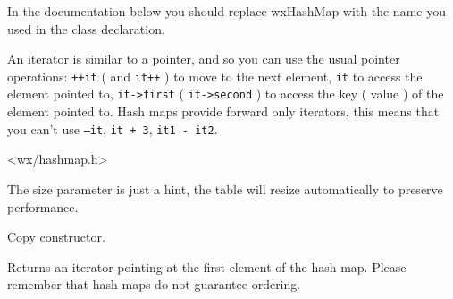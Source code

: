 
In the documentation below you should replace wxHashMap with the name
you used in the class declaration.

\begin{twocollist}
\end{twocollist}


An iterator is similar to a pointer, and so you can use the usual pointer
operations: {\tt ++it} ( and {\tt it++} ) to move to the next element,
{\tt *it} to access the element pointed to, {\tt it->first}
( {\tt it->second} ) to access the key ( value )
of the element pointed to. Hash maps provide forward only iterators, this
means that you can't use {\tt --it}, {\tt it + 3}, {\tt it1 - it2}.


<wx/hashmap.h>


\label{wxhashmapctor}


The size parameter is just a hint, the table will resize automatically
to preserve performance.


Copy constructor.

\label{wxhashmapbegin}



Returns an iterator pointing at the first element of the hash map.
Please remember that hash maps do not guarantee ordering.

\label{wxhashmapclear}

